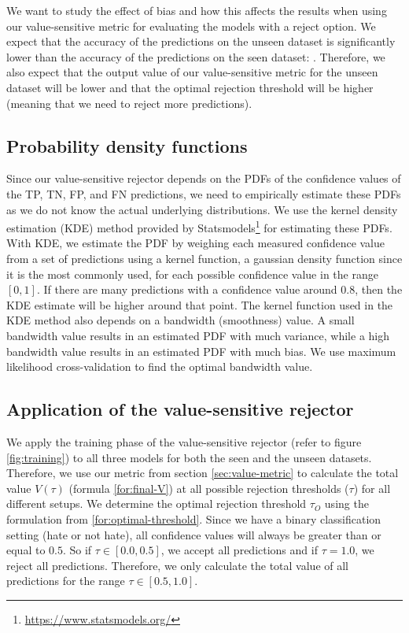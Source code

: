 %
We want to study the effect of bias and how this affects the results when using our value-sensitive metric for evaluating the models with a reject option.
%
We expect that the accuracy of the predictions on the unseen dataset is significantly lower than the accuracy of the predictions on the seen dataset: \citet{grondahl2018all, arango2019hate}.
%
Therefore, we also expect that the output value of our value-sensitive metric for the unseen dataset will be lower and that the optimal rejection threshold will be higher (meaning that we need to reject more predictions).
%

\subsection{Probability density functions}
Since our value-sensitive rejector depends on the PDFs of the confidence values of the TP, TN, FP, and FN predictions, we need to empirically estimate these PDFs as we do not know the actual underlying distributions.
%
We use the kernel density estimation (KDE) method provided by Statsmodels\footnote{\url{https://www.statsmodels.org/}} for estimating these PDFs.
%
With KDE, we estimate the PDF by weighing each measured confidence value from a set of predictions using a kernel function, a gaussian density function since it is the most commonly used, for each possible confidence value in the range $[0, 1]$.
%
If there are many predictions with a confidence value around $0.8$, then the KDE estimate will be higher around that point.
%
The kernel function used in the KDE method also depends on a bandwidth (smoothness) value.
%
A small bandwidth value results in an estimated PDF with much variance, while a high bandwidth value results in an estimated PDF with much bias.
%
We use maximum likelihood cross-validation to find the optimal bandwidth value.

\subsection{Application of the value-sensitive rejector}
\label{sec:rejector-application}
We apply the training phase of the value-sensitive rejector (refer to figure \ref{fig:training}) to all three models for both the seen and the unseen datasets.
%
Therefore, we use our metric from section \ref{sec:value-metric} to calculate the total value $V(\tau)$ (formula \ref{for:final-V}) at all possible rejection thresholds ($\tau$) for all different setups.
%
We determine the optimal rejection threshold $\tau_O$ using the formulation from \ref{for:optimal-threshold}.
%
Since we have a binary classification setting (hate or not hate), all confidence values will always be greater than or equal to $0.5$.
%
So if $\tau \in [0.0, 0.5]$, we accept all predictions and if $\tau = 1.0$, we reject all predictions.
%
Therefore, we only calculate the total value of all predictions for the range $\tau \in [0.5, 1.0]$.
%

